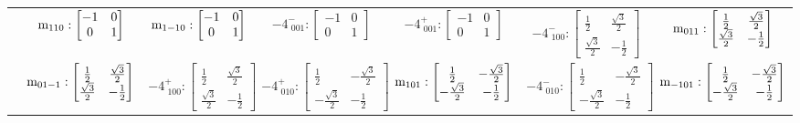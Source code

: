 \documentclass[fleqn,8pt,landscape]{jsarticle}
\begin{document}
\begin{longtable}{ccccccc}
& $ {\rm m}_{110}:\begin{bmatrix} -1 & 0 \\ 0 & 1 \end{bmatrix} $ & $ {\rm m}_{1-10}:\begin{bmatrix} -1 & 0 \\ 0 & 1 \end{bmatrix} $ & $ -4^{-}_{\,\,001}:\begin{bmatrix} -1 & 0 \\ 0 & 1 \end{bmatrix} $ & $ -4^{+}_{\,\,001}:\begin{bmatrix} -1 & 0 \\ 0 & 1 \end{bmatrix} $ & $ -4^{-}_{\,\,100}:\begin{bmatrix} \frac{1}{2} & \frac{\sqrt{3}}{2} \\ \frac{\sqrt{3}}{2} & - \frac{1}{2} \end{bmatrix} $ & $ {\rm m}_{011}:\begin{bmatrix} \frac{1}{2} & \frac{\sqrt{3}}{2} \\ \frac{\sqrt{3}}{2} & - \frac{1}{2} \end{bmatrix} $ \\
& $ {\rm m}_{01-1}:\begin{bmatrix} \frac{1}{2} & \frac{\sqrt{3}}{2} \\ \frac{\sqrt{3}}{2} & - \frac{1}{2} \end{bmatrix} $ & $ -4^{+}_{\,\,100}:\begin{bmatrix} \frac{1}{2} & \frac{\sqrt{3}}{2} \\ \frac{\sqrt{3}}{2} & - \frac{1}{2} \end{bmatrix} $ & $ -4^{+}_{\,\,010}:\begin{bmatrix} \frac{1}{2} & - \frac{\sqrt{3}}{2} \\ - \frac{\sqrt{3}}{2} & - \frac{1}{2} \end{bmatrix} $ & $ {\rm m}_{101}:\begin{bmatrix} \frac{1}{2} & - \frac{\sqrt{3}}{2} \\ - \frac{\sqrt{3}}{2} & - \frac{1}{2} \end{bmatrix} $ & $ -4^{-}_{\,\,010}:\begin{bmatrix} \frac{1}{2} & - \frac{\sqrt{3}}{2} \\ - \frac{\sqrt{3}}{2} & - \frac{1}{2} \end{bmatrix} $ & $ {\rm m}_{-101}:\begin{bmatrix} \frac{1}{2} & - \frac{\sqrt{3}}{2} \\ - \frac{\sqrt{3}}{2} & - \frac{1}{2} \end{bmatrix} $ \\ \hline

\end{longtable}
\end{document}
